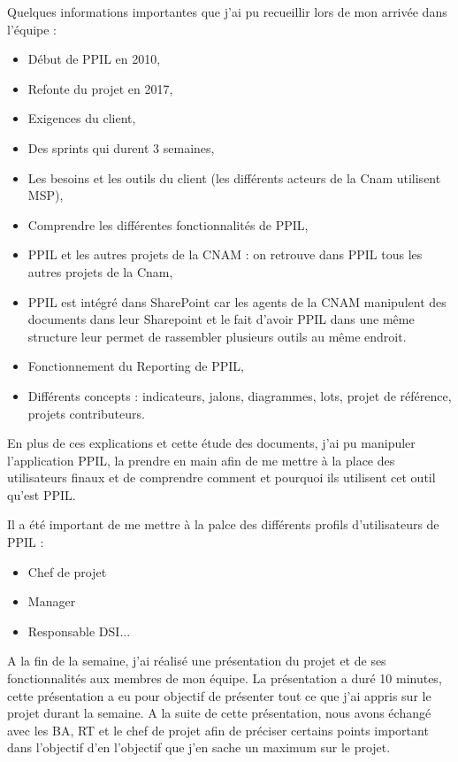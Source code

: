 Quelques informations importantes que j'ai pu recueillir lors de mon arrivée dans l'équipe :
\begin{itemize}
    \item Début de PPIL en 2010, 
    \item Refonte du projet en 2017, 
    \item Exigences du client,
    \item Des sprints qui durent 3 semaines, 
    \item Les besoins et les outils du client (les différents acteurs de la Cnam utilisent MSP),
    \item Comprendre les différentes fonctionnalités de PPIL,
    \item PPIL et les autres projets de la CNAM : on retrouve dans PPIL tous les autres projets de la Cnam,
    \item PPIL est intégré dans SharePoint car les agents de la CNAM manipulent des documents dans leur Sharepoint et le fait d'avoir PPIL dans une même structure leur permet de rassembler plusieurs outils au même endroit.
    \item Fonctionnement du Reporting de PPIL, 
    \item Différents concepts : indicateurs, jalons, diagrammes, lots, projet de référence, projets contributeurs.
\end{itemize}

En plus de ces explications et cette étude des documents, j'ai pu manipuler l'application PPIL, la prendre en main afin de me mettre à la place des utilisateurs finaux et de comprendre comment et pourquoi ils utilisent cet outil qu'est PPIL.

Il a été important de me mettre à la palce des différents profils d'utilisateurs de PPIL :
\begin{itemize}
    \item Chef de projet
    \item Manager
    \item Responsable DSI...
\end{itemize}

A la fin de la semaine, j'ai réalisé une présentation du projet et de ses fonctionnalités aux membres de mon équipe. La présentation a duré 10 minutes, cette présentation a eu pour objectif de présenter tout ce que j'ai appris sur le projet durant la semaine. A la suite de cette présentation, nous avons échangé avec les BA, RT et le chef de projet afin de préciser certains points important dans l'objectif d'en l'objectif que j'en sache un maximum sur le projet.

